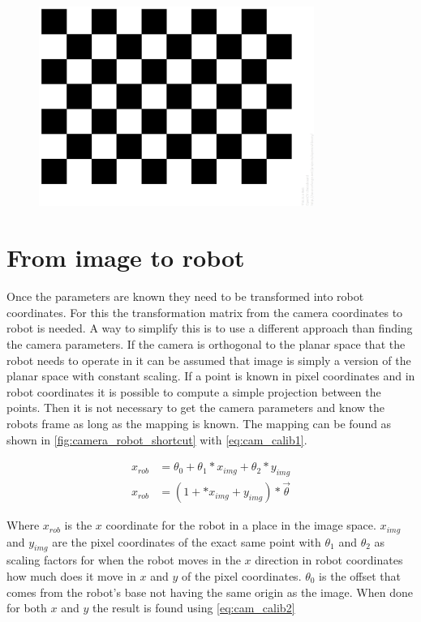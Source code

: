 \begin{figure}[h]
\centering
\includegraphics[width=0.8\textwidth]{figures/checkerbord_pattern.png}
\caption{}
\label{fig:checkerbord_pattern}
\end{figure}


\section{From image to robot}
Once the parameters are known they need to be transformed into robot coordinates. For this the transformation matrix from the camera coordinates to robot is needed. A way to simplify this is to use a different approach than finding the camera parameters. If the camera is orthogonal to the planar space that the robot needs to operate in it can be assumed that image is simply a version of the planar space with constant scaling. If a point is known in pixel coordinates and in robot coordinates it is possible to compute a simple projection between the points. Then it is not necessary to get the camera parameters and know the robots frame as long as the mapping is known. The mapping can be found as shown in \autoref{fig:camera_robot_shortcut} with \autoref{eq:cam_calib1}.

\begin{equation}\label{eq:cam_calib1}
\begin{split}
x_{rob}&=\theta_{0}+\theta_{1}*x_{img}+\theta_{2}*y_{img}\\
x_{rob}&=(1+*x_{img}+y_{img}) * \vec{\theta}
\end{split}
\end{equation}

Where $x_{rob}$ is the $ x $ coordinate for the robot in a place in the image space. $x_{img}$ and $y_{img}$ are the pixel coordinates of the exact same point with $\theta_1$ and $\theta_2$ as scaling factors for when the robot moves in the $ x $ direction in robot coordinates how much does it move in $ x $ and $ y $ of the pixel coordinates. $\theta_0$ is the offset that comes from the robot's base not having the same origin as the image. When done for both $ x $ and $ y $ the result is found using \autoref{eq:cam_calib2}
 
